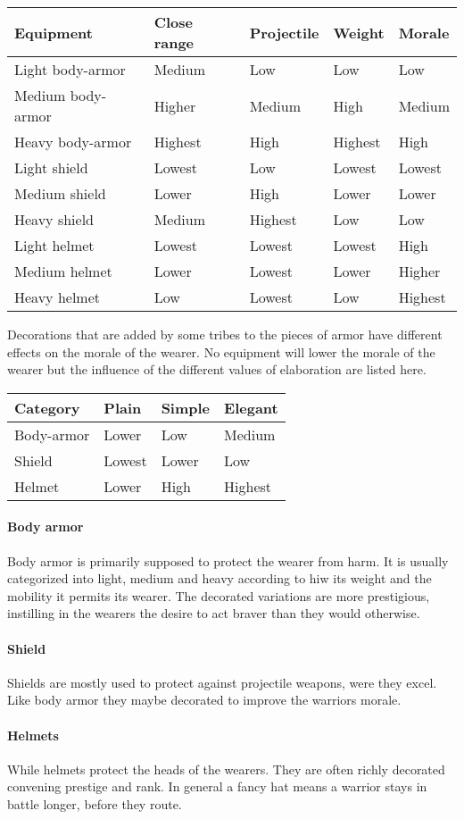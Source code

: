 \begin{longtable}{lllll}
	\toprule
	Equipment
	 & Close range & Projectile & Weight  & Morale  \\
	\midrule
	Light body-armor
	 & Medium      & Low        & Low     & Low     \\
	Medium body-armor
	 & Higher      & Medium     & High    & Medium  \\
	Heavy body-armor
	 & Highest     & High       & Highest & High    \\
	\midrule
	Light shield
	 & Lowest      & Low        & Lowest  & Lowest  \\
	Medium shield
	 & Lower       & High       & Lower   & Lower   \\
	Heavy shield
	 & Medium      & Highest    & Low     & Low     \\
	\midrule
	Light helmet
	 & Lowest      & Lowest     & Lowest  & High    \\
	Medium helmet
	 & Lower       & Lowest     & Lower   & Higher  \\
	Heavy helmet
	 & Low         & Lowest     & Low     & Highest \\
	\bottomrule
\end{longtable}

Decorations that are added by some tribes to the pieces of armor have different
effects on the morale of the wearer. No equipment will lower the morale of the
wearer but the influence of the different values of elaboration are listed
here.

\begin{longtable}{llll}
	\toprule
	Category   & Plain  & Simple & Elegant \\
	\midrule
	Body-armor & Lower  & Low    & Medium  \\
	Shield     & Lowest & Lower  & Low     \\
	Helmet     & Lower  & High   & Highest \\
	\bottomrule
\end{longtable}

\paragraph{Body armor}
Body armor is primarily supposed to protect the wearer from harm. It is usually
categorized into light, medium and heavy according to hiw its weight and the
mobility it permits its wearer. The decorated variations are more prestigious,
instilling in the wearers the desire to act braver than they would otherwise.

\paragraph{Shield}
Shields are mostly used to protect against projectile weapons, were they excel.
Like body armor they maybe decorated to improve the warriors morale.

\paragraph{Helmets}
While helmets protect the heads of the wearers. They are often richly decorated
convening prestige and rank. In general a fancy hat means a warrior stays in
battle longer, before they route.
